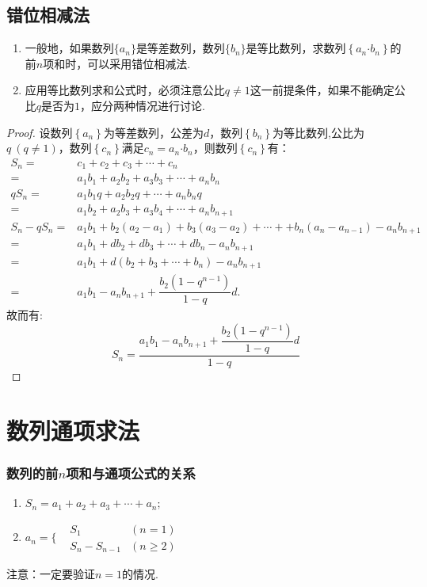   \subsection{错位相减法}
  \begin{enumerate}
  \item 一般地，如果数列$\{a_n\}$是等差数列，数列$\{b_n\}$是等比数列，求数列$ \left\{a_n\bm{\cdot}b_n\right\} $的前$ n $项和时，可以采用错位相减法.
  \item 应用等比数列求和公式时，必须注意公比$ q\ne1 $这一前提条件，如果不能确定公比$ q $是否为$ 1 $，应分两种情况进行讨论.
  \end{enumerate}
  \begin{proof}
  设数列$ \left\{a_n\right\} $为等差数列，公差为$ d $，数列$ \left\{b_n\right\} $为等比数列,公比为$ q ~(q\ne1)$，数列$ \left\{c_n\right\}$满足$ c_n=a_n\bm{\cdot}b_n  $，则数列$ \left\{c_n\right\} $有：\begin{equation*}
  \begin{aligned}
  S_n=&c_1+c_2+c_3+\cdots+c_n\\
  =&a_1b_1+a_2b_2+a_3b_3+\cdots+a_nb_n\\
  qS_n=&a_1b_1q+a_2b_2q+\cdots+a_nb_nq\\
  =&a_1b_2+a_2b_3+a_3b_4+\cdots+a_nb_{n+1}\\
  S_n-qS_n=&a_1b_1+b_2\left(a_2-a_1\right)+b_3\left(a_3-a_2\right)+\cdots++b_n\left(a_n-a_{n-1}\right)-a_nb_{n+1}\\
  =&a_1b_1+db_2+db_3+\cdots+db_n-a_nb_{n+1}\\
  =&a_1b_1+d\left(b_2+b_3+\cdots+b_n\right)-a_nb_{n+1}\\
  =&a_1b_1-a_nb_{n+1}+\dfrac{b_2\left(1-q^{n-1}\right)}{1-q}d.
  \end{aligned}
  \end{equation*}
  故而有:$$S_n=\dfrac{a_1b_1-a_nb_{n+1}+\dfrac{b_2\left(1-q^{n-1}\right)}{1-q}d}{1-q}$$
  \end{proof}
\section{数列通项求法}
  \subsubsection{数列的前$ n $项和与通项公式的关系}
  \begin{enumerate}[1)]
  \item $ S_n=a_1+a_2+a_3+\cdots+a_n $;
  \item $ a_n=\Bigg\{\begin{aligned}
  &S_1&\left(n=1\right)\\
  &S_n-S_{n-1}&\left(n\ge2\right)
  \end{aligned} $
  \end{enumerate}
  注意：一定要验证$ n=1 $的情况.
